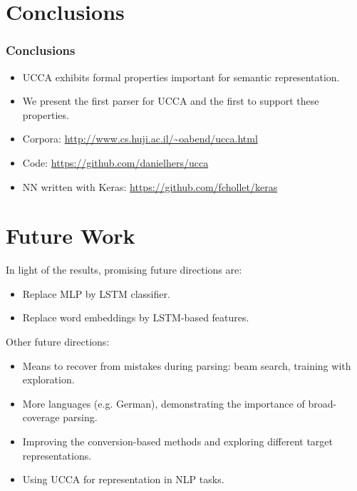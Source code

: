 \documentclass[t]{beamer}
\begin{document}
\section{Conclusions}

\begin{frame}
\frametitle{Conclusions}
\begin{itemize}
 \item UCCA exhibits formal properties important for semantic representation.
 \item We present the first parser for UCCA and the first to support these properties.
\end{itemize}

\vfill
\pause
\begin{itemize}
 \item Corpora: \url{http://www.cs.huji.ac.il/~oabend/ucca.html}
 \item Code: \url{https://github.com/danielhers/ucca}
 \item NN written with Keras: \url{https://github.com/fchollet/keras}
\end{itemize}
\end{frame}



\section{Future Work}

\begin{frame}
In light of the results, promising future directions are:
\begin{itemize}
 \item Replace MLP by LSTM classifier.
 \item Replace word embeddings by LSTM-based features.
\end{itemize}

\vfill
\pause
Other future directions:
\begin{itemize}
 \item Means to recover from mistakes during parsing:
 beam search, training with exploration.
 \item More languages (e.g. German),
 demonstrating the importance of broad-coverage parsing.
 \item Improving the conversion-based methods and exploring different target representations.
 \item Using UCCA for representation in NLP tasks.
\end{itemize}
\end{frame}
\end{document}

